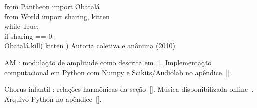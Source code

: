 	\begin{epigrafebot}
		{from Pantheon import Obatalá\, \, \, \\
                from World import sharing, kitten \\
                \vspace{.1in}
                while True: \; \; \; \; \; \; \; \; \; \; \; \; \; \; \; \,\\
                    if sharing == 0: \; \; \; \; \;  \; \; \; \; \; \\
                        Obatalá.kill( kitten )}
        {Autoria coletiva e anônima (2010)}
	\end{epigrafebot}



\afterpage{\blankpage}

\resumoeabstract %

\afterpage{\blankpage}


\listadefiguras %



	\begin{listaespecial}[BIGNAMEWIDTH]
		\item[AM]: modulação de amplitude como descrita em~\ref{}. Implementação computacional em Python com Numpy e Scikits/Audiolab no apêndice~\ref{}.
	\end{listaespecial} 

\afterpage{\blankpage}

	\begin{listaespecial}[BIGNAMEWIDTH]
		\item[Chorus infantil]: relações harmônicas da seção~\ref{}. Música disponibilizada online~\cite{}. Arquivo Python no apêndice~\ref{}.
	\end{listaespecial} 

